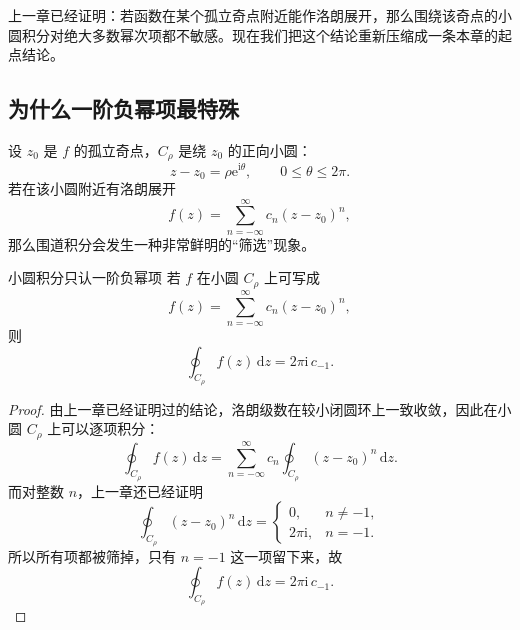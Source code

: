 上一章已经证明：若函数在某个孤立奇点附近能作洛朗展开，那么围绕该奇点的小圆积分对绝大多数幂次项都不敏感。现在我们把这个结论重新压缩成一条本章的起点结论。

\subsection{为什么一阶负幂项最特殊}

设 $z_0$ 是 $f$ 的孤立奇点，$C_\rho$ 是绕 $z_0$ 的正向小圆：
\[
    z-z_0=\rho\mathrm{e}^{\mathrm{i}\theta},\qquad 0\le \theta\le 2\pi.
\]
若在该小圆附近有洛朗展开
\[
    f(z)=\sum_{n=-\infty}^{\infty} c_n (z-z_0)^n,
\]
那么围道积分会发生一种非常鲜明的``筛选''现象。

\begin{tuilun}{小圆积分只认一阶负幂项}{}
若 $f$ 在小圆 $C_\rho$ 上可写成
\[
    f(z)=\sum_{n=-\infty}^{\infty} c_n (z-z_0)^n,
\]
则
\[
    \oint_{C_\rho} f(z)\,\mathrm{d}z
    =
    2\pi \mathrm{i}\, c_{-1}.
\]
\end{tuilun}

\begin{proof}
由上一章已经证明过的结论，洛朗级数在较小闭圆环上一致收敛，因此在小圆 $C_\rho$ 上可以逐项积分：
\[
    \oint_{C_\rho} f(z)\,\mathrm{d}z
    =
    \sum_{n=-\infty}^{\infty} c_n
    \oint_{C_\rho} (z-z_0)^n\,\mathrm{d}z.
\]
而对整数 $n$，上一章还已经证明
\[
    \oint_{C_\rho}(z-z_0)^n\,\mathrm{d}z
    =
    \begin{cases}
        0, & n\ne -1,\\[4pt]
        2\pi \mathrm{i}, & n=-1.
    \end{cases}
\]
所以所有项都被筛掉，只有 $n=-1$ 这一项留下来，故
\[
    \oint_{C_\rho} f(z)\,\mathrm{d}z
    =
    2\pi \mathrm{i}\, c_{-1}.
\]
\end{proof}

